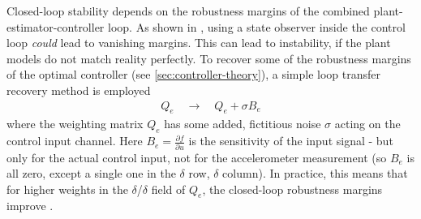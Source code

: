 Closed-loop stability depends on the robustness margins of the combined plant-estimator-controller loop.
As shown in \cite{doyle1978}, using a state observer inside the control loop \textit{could} lead to vanishing margins.
This can lead to instability, if the plant models do not match reality perfectly.
To recover some of the robustness margins of the optimal controller (see \autoref{sec:controller-theory}), a simple loop transfer recovery method is employed \cite{werner2021}
\begin{align}
    Q_e \quad \to \quad Q_e + \sigma B_e
\end{align}
where the weighting matrix $Q_e$ has some added, fictitious noise $\sigma$ acting on the control input channel.
Here $B_e = \frac{\partial f}{\partial u}$ is the sensitivity of the input signal - but only for the actual control input, not for the accelerometer measurement (so $B_e$ is all zero, except a single one in the $\delta$ row, $\delta$ column).
In practice, this means that for higher weights in the $\delta$/$\delta$ field of $Q_e$, the closed-loop robustness margins improve \cite{werner2021}.


